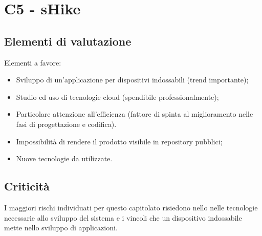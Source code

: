 \section{C5 - sHike}{
	\subsection{Elementi di valutazione}{
		Elementi a favore:
		\begin{itemize}
			\item Sviluppo di un'applicazione per dispositivi indossabili (trend importante);
			\item Studio ed uso di tecnologie cloud (spendibile professionalmente);
			\item Particolare attenzione all'efficienza (fattore di spinta al miglioramento nelle fasi di progettazione e codifica).
		\end{itemize}
		
		\begin{itemize}
			\item Impossibilità di rendere il prodotto visibile in repository pubblici;
			\item Nuove tecnologie da utilizzate.
		\end{itemize}
	}
	\subsection{Criticità}{
		I maggiori rischi individuati per questo capitolato risiedono nello nelle tecnologie necessarie allo sviluppo del sistema e i vincoli che un dispositivo indossabile mette nello sviluppo di applicazioni. 
	}
}